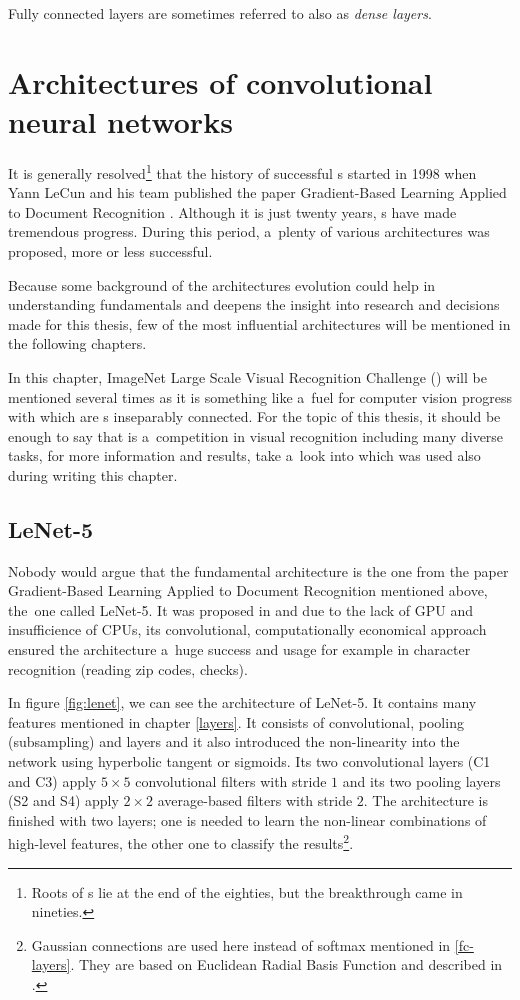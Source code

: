 Fully connected layers are sometimes referred to also as \textit{dense layers}.

\section{Architectures of convolutional neural networks}
\label{cnn-architectures}

It is generally resolved\footnote{Roots of s lie at the end of
the eighties, but the breakthrough came in nineties.} that the history of
successful s started in 1998 when Yann LeCun and his team published the
paper Gradient-Based Learning Applied to Document Recognition \cite{lenet5}.
Although it is just twenty years, s have made tremendous progress.
During this period, a~plenty of various architectures was proposed, more or
less successful.

Because some background of the  architectures evolution could help in 
understanding  fundamentals and deepens the insight into research and 
decisions made for this thesis, few of the most influential architectures will
be mentioned in the following chapters.

In this chapter, ImageNet Large Scale Visual Recognition Challenge
() will be mentioned several times as it is something like a~fuel
for computer vision progress with which are s inseparably connected.
For the topic of this thesis, it should be enough to say that  is
a~competition in visual recognition including many diverse tasks, for more
information and results, take a~look into \cite{ILSVRC} which was used also
during writing this chapter.

\subsection{LeNet-5} %
\label{lenet}

Nobody would argue that the fundamental architecture is the one from the paper 
Gradient-Based Learning Applied to Document Recognition mentioned above,
the~one called LeNet-5. It was proposed in \cite{lenet5} and due to the lack of
GPU and insufficience of CPUs, its convolutional, computationally economical
approach ensured the architecture a~huge success and usage for example in
character recognition (reading zip codes, checks). 

In figure \ref{fig:lenet}, we can see the architecture of LeNet-5. It contains 
many features mentioned in chapter \ref{layers}. It consists of convolutional, 
pooling (subsampling) and  layers and it also introduced the 
non-linearity into the network using hyperbolic tangent or sigmoids. Its two 
convolutional layers (C1 and C3) apply $5 \times 5$ convolutional filters with 
stride $1$ and its two pooling layers (S2 and S4) apply $2 \times 2$ 
average-based filters with stride $2$. The architecture is finished with two 
 layers; one is needed to learn the non-linear combinations of
high-level features, the other one to classify the results\footnote{Gaussian
connections are used here instead of softmax mentioned in \ref{fc-layers}. They
are based on Euclidean Radial Basis Function and described in \cite{lenet5}.}.

